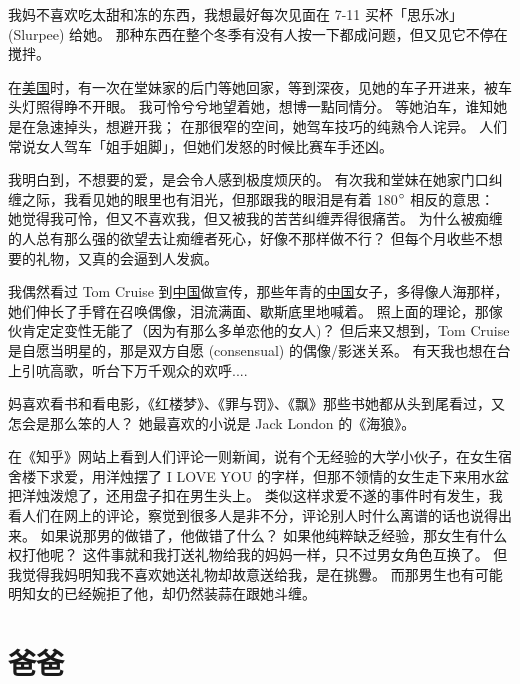 \documentclass[12pt]{report}
\newcommand{\cc}[2]{#1}
\newcommand{\cc}[2]{#2}
\begin{document}
\cc{
我妈不喜欢吃太甜和冻的东西，我想最好每次见面在 7-11 买杯「思乐冰」(Slurpee) 给她。 那种东西在整个冬季有没有人按一下都成问题，但又见它不停在搅拌。
}{
	
}

\cc{
在\uline{美国}时，有一次在堂妹家的后门等她回家，等到深夜，见她的车子开进来，被车头灯照得睁不开眼。 我可怜兮兮地望着她，想博一點同情分。 等她泊车，谁知她是在急速掉头，想避开我； 在那很窄的空间，她驾车技巧的纯熟令人诧异。 人们常说女人驾车「姐手姐脚」，但她们发怒的时候比赛车手还凶。
}{
	
}

\cc{
我明白到，不想要的爱，是会令人感到极度烦厌的。 有次我和堂妹在她家门口纠缠之际，我看见她的眼里也有泪光，但那跟我的眼泪是有着 180$\degree$ 相反的意思： 她觉得我可怜，但又不喜欢我，但又被我的苦苦纠缠弄得很痛苦。 为什么被痴缠的人总有那么强的欲望去让痴缠者死心，好像不那样做不行？ 但每个月收些不想要的礼物，又真的会逼到人发疯。
}{
	
}

\cc{
我偶然看过 Tom Cruise 到\uline{中国}做宣传，那些年青的\uline{中国}女子，多得像人海那样，她们伸长了手臂在召唤偶像，泪流满面、歇斯底里地喊着。 照上面的理论，那傢伙肯定定变性无能了（因为有那么多单恋他的女人)？ 但后来又想到，Tom Cruise 是自愿当明星的，那是双方自愿 (consensual) 的偶像/影迷关系。 有天我也想在台上引吭高歌，听台下万千观众的欢呼....
}{
	
}

\cc{
妈喜欢看书和看电影，《红楼梦》、《罪与罚》、《飘》那些书她都从头到尾看过，又怎会是那么笨的人？ 她最喜欢的小说是 Jack London 的《海狼》。
}{
	
}

\cc{
在《知乎》网站上看到人们评论一则新闻，说有个无经验的大学小伙子，在女生宿舍楼下求爱，用洋烛摆了 I LOVE YOU 的字样，但那不领情的女生走下来用水盆把洋烛泼熄了，还用盘子扣在男生头上。  类似这样求爱不遂的事件时有发生，我看人们在网上的评论，察觉到很多人是非不分，评论别人时什么离谱的话也说得出来。 如果说那男的做错了，他做错了什么？  如果他纯粹缺乏经验，那女生有什么权打他呢？  这件事就和我打送礼物给我的妈妈一样，只不过男女角色互换了。  但我觉得我妈明知我不喜欢她送礼物却故意送给我，是在挑釁。  而那男生也有可能明知女的已经婉拒了他，却仍然装蒜在跟她斗缠。
}{
	
}


\chapter{\cc{爸爸}{Daddy}}
\end{document}
